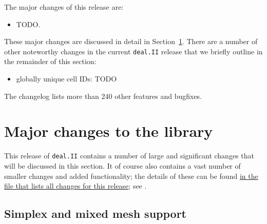 \documentclass{ansarticle-preprint}
\newcommand{\specialword}[1]{\texttt{#1}}
\newcommand{\dealii}{{\specialword{deal.II}}\xspace}
\begin{document}
The major changes of this release are:
%
\begin{itemize}
  \item TODO.
\end{itemize}
%
These major changes are discussed in detail in Section~\ref{sec:major}. There
are a number of other noteworthy changes in the current \dealii{} release
that we briefly outline in the remainder of this section:
%
\begin{itemize}
  \item globally unique cell IDs: TODO
\end{itemize}
%
The changelog lists more than 240 other
features and bugfixes.




\section{Major changes to the library}
\label{sec:major}

This release of \dealii{} contains a number of large and significant changes
that will be discussed in this section.
It of course also contains a
vast number of smaller changes and added functionality; the details of these
can be found
\href{https://dealii.org/developer/doxygen/deal.II/changes_between_9_2_0_and_9_3_0.html}
{in the file that lists all changes for this release}; see \cite{changes93}.


\subsection{Simplex and mixed mesh support}
\label{subsec:simplex}
\end{document}
